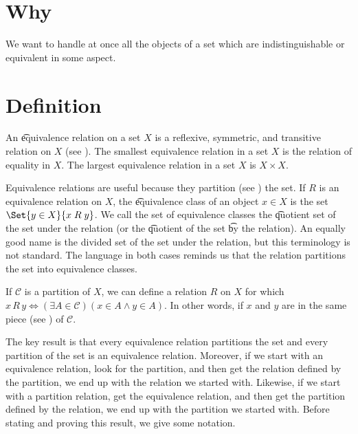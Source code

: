 

\section*{Why}

We want to handle at once all the objects of a set which are indistinguishable or equivalent in some aspect.

\section*{Definition}

An \t{equivalence relation} on a set $X$ is a reflexive, symmetric, and transitive relation on $X$ (see ).
The smallest equivalence relation in a set $X$ is the relation of equality in $X$.
The largest equivalence relation in a set $X$ is $X \times X$.

Equivalence relations are useful because they partition (see ) the set.
If $R$ is an equivalence relation on $X$, the \t{equivalence class} of an object $x \in X$ is the set $\Set{y \in X}{x\;R\;y}$.
We call the set of equivalence classes the \t{quotient set} of the set under the relation (or the \t{quotient} of the set \t{by the relation}).
An equally good name is the divided set of the set under the relation, but this terminology is not standard.
The language in both cases reminds us that the relation partitions the set into equivalence classes.

If $\mathcal{C} $ is a partition of $X$, we can define a relation $R$ on $X$ for which $x\,R\,y \iff (\exists A \in \mathcal{C} )(x \in A \land y \in A)$.
In other words, if $x$ and $y$ are in the same piece (see ) of $\mathcal{C} $.

The key result is that every equivalence relation partitions the set and every partition of the set is an equivalence relation.
Moreover, if we start with an equivalence relation, look for the partition, and then get the relation defined by the partition, we end up with the relation we started with.
Likewise, if we start with a partition relation, get the equivalence relation, and then get the partition defined by the relation, we end up with the partition we started with.
Before stating and proving this result, we give some notation.

